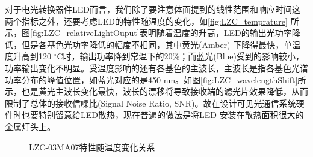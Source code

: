 对于电光转换器件LED而言，我们除了要注意体面提到的线性范围和响应时间这两个指标之外，还要考虑LED的特性随温度的变化，如\autoref{fig:LZC_temprature} 所示\cite{LZC2013}，图\ref{fig:LZC_relativeLightOuput}表明随着温度的升高，LED的输出光功率降低，但是各基色光功率降低的幅度不相同，其中黄光(Amber) 下降得最快，单温度升高到120 $^{\circ}$C时，输出功率降到常温下的20\%；而蓝光(Blue)受到的影响较小，功率输出变化不明显。受温度影响的还有各基色的主波长，主波长是指各基色光谱功率分布的峰值位置，如蓝光对应的是450 nm。如图\ref{fig:LZC_wavelengthShift}所示，也是黄光主波长变化最快，波长的漂移将导致接收端的滤光片效果降低，从而限制了总体的接收信噪比(Signal Noise Ratio, SNR)。故在设计可见光通信系统硬件时也要特别留意给LED散热，现在普遍的做法是将LED 安装在散热面积很大的金属灯头上。
\begin{figure}[h]
    \centering
    \caption{LZC-03MA07特性随温度变化关系}
    \label{fig:LZC_temprature}
\end{figure}

